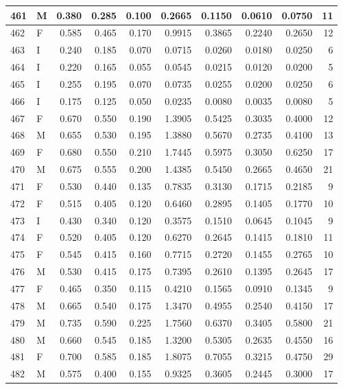 \documentclass[9pt,twocolumn,twoside,]{pnas-new}
\begin{document}
\begin{tabular}{l|l|r|r|r|r|r|r|r|r}
\hline
461 & M & 0.380 & 0.285 & 0.100 & 0.2665 & 0.1150 & 0.0610 & 0.0750 & 11\\
\hline
462 & F & 0.585 & 0.465 & 0.170 & 0.9915 & 0.3865 & 0.2240 & 0.2650 & 12\\
\hline
463 & I & 0.240 & 0.185 & 0.070 & 0.0715 & 0.0260 & 0.0180 & 0.0250 & 6\\
\hline
464 & I & 0.220 & 0.165 & 0.055 & 0.0545 & 0.0215 & 0.0120 & 0.0200 & 5\\
\hline
465 & I & 0.255 & 0.195 & 0.070 & 0.0735 & 0.0255 & 0.0200 & 0.0250 & 6\\
\hline
466 & I & 0.175 & 0.125 & 0.050 & 0.0235 & 0.0080 & 0.0035 & 0.0080 & 5\\
\hline
467 & F & 0.670 & 0.550 & 0.190 & 1.3905 & 0.5425 & 0.3035 & 0.4000 & 12\\
\hline
468 & M & 0.655 & 0.530 & 0.195 & 1.3880 & 0.5670 & 0.2735 & 0.4100 & 13\\
\hline
469 & F & 0.680 & 0.550 & 0.210 & 1.7445 & 0.5975 & 0.3050 & 0.6250 & 17\\
\hline
470 & M & 0.675 & 0.555 & 0.200 & 1.4385 & 0.5450 & 0.2665 & 0.4650 & 21\\
\hline
471 & F & 0.530 & 0.440 & 0.135 & 0.7835 & 0.3130 & 0.1715 & 0.2185 & 9\\
\hline
472 & F & 0.515 & 0.405 & 0.120 & 0.6460 & 0.2895 & 0.1405 & 0.1770 & 10\\
\hline
473 & I & 0.430 & 0.340 & 0.120 & 0.3575 & 0.1510 & 0.0645 & 0.1045 & 9\\
\hline
474 & F & 0.520 & 0.405 & 0.120 & 0.6270 & 0.2645 & 0.1415 & 0.1810 & 11\\
\hline
475 & F & 0.545 & 0.415 & 0.160 & 0.7715 & 0.2720 & 0.1455 & 0.2765 & 10\\
\hline
476 & M & 0.530 & 0.415 & 0.175 & 0.7395 & 0.2610 & 0.1395 & 0.2645 & 17\\
\hline
477 & F & 0.465 & 0.350 & 0.115 & 0.4210 & 0.1565 & 0.0910 & 0.1345 & 9\\
\hline
478 & M & 0.665 & 0.540 & 0.175 & 1.3470 & 0.4955 & 0.2540 & 0.4150 & 17\\
\hline
479 & M & 0.735 & 0.590 & 0.225 & 1.7560 & 0.6370 & 0.3405 & 0.5800 & 21\\
\hline
480 & M & 0.660 & 0.545 & 0.185 & 1.3200 & 0.5305 & 0.2635 & 0.4550 & 16\\
\hline
481 & F & 0.700 & 0.585 & 0.185 & 1.8075 & 0.7055 & 0.3215 & 0.4750 & 29\\
\hline
482 & M & 0.575 & 0.400 & 0.155 & 0.9325 & 0.3605 & 0.2445 & 0.3000 & 17\\

\end{tabular}
\end{document}
